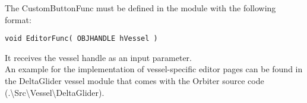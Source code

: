 \documentclass[Orbiter Developer Manual.tex]{subfiles}
\begin{document}
\noindent
The CustomButtonFunc must be defined in the module with the following format:

\begin{lstlisting}
void EditorFunc( OBJHANDLE hVessel )
\end{lstlisting}

\noindent
It receives the vessel handle as an input parameter.\\
An example for the implementation of vessel-specific editor pages can be found in the DeltaGlider vessel module that comes with the Orbiter source code (.\textbackslash Src\textbackslash Vessel\textbackslash DeltaGlider).
\end{document}
